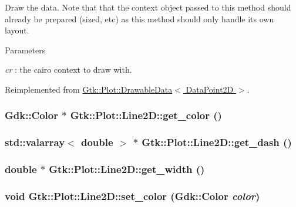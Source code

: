 Draw the data. Note that that the context object passed to this method should already be prepared (sized, etc) as this method should only handle its own layout. 
\begin{DoxyParams}{Parameters}
\item[{\em cr}]: the cairo context to draw with. \end{DoxyParams}


Reimplemented from \hyperlink{classGtk_1_1Plot_1_1DrawableData_a275c0162df2dfdd060e859b63077614c}{Gtk::Plot::DrawableData$<$ DataPoint2D $>$}.\hypertarget{classGtk_1_1Plot_1_1Line2D_a29fb56ef0f66aa944d33f7327f5ab250}{
\subsubsection[{get\_\-color}]{\setlength{\rightskip}{0pt plus 5cm}Gdk::Color $\ast$ Gtk::Plot::Line2D::get\_\-color ()}}
\label{classGtk_1_1Plot_1_1Line2D_a29fb56ef0f66aa944d33f7327f5ab250}
\hypertarget{classGtk_1_1Plot_1_1Line2D_aca5b60a9b12895f64dba26d153c99785}{
\subsubsection[{get\_\-dash}]{\setlength{\rightskip}{0pt plus 5cm}std::valarray$<$ double $>$ $\ast$ Gtk::Plot::Line2D::get\_\-dash ()}}
\label{classGtk_1_1Plot_1_1Line2D_aca5b60a9b12895f64dba26d153c99785}
\hypertarget{classGtk_1_1Plot_1_1Line2D_a536017770621160e6e8c19c19b0485f2}{
\subsubsection[{get\_\-width}]{\setlength{\rightskip}{0pt plus 5cm}double $\ast$ Gtk::Plot::Line2D::get\_\-width ()}}
\label{classGtk_1_1Plot_1_1Line2D_a536017770621160e6e8c19c19b0485f2}
\hypertarget{classGtk_1_1Plot_1_1Line2D_aeddda540e6d9c98d6495fdac8ceb7d3e}{
\subsubsection[{set\_\-color}]{\setlength{\rightskip}{0pt plus 5cm}void Gtk::Plot::Line2D::set\_\-color (Gdk::Color {\em color})}}
